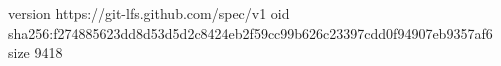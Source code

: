 version https://git-lfs.github.com/spec/v1
oid sha256:f274885623dd8d53d5d2c8424eb2f59cc99b626c23397cdd0f94907eb9357af6
size 9418
